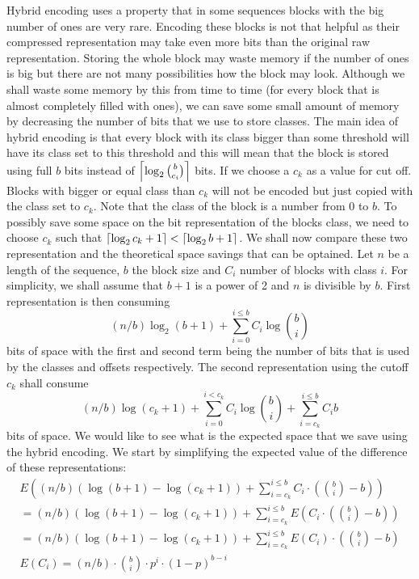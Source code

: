 Hybrid encoding uses a property that in some sequences blocks with the big number
of ones are very rare. Encoding these blocks is not that helpful as their
compressed representation may take even more bits than the original raw
representation. Storing the whole block may waste memory if the number of
ones is big but there are not many possibilities how the block may look.
Although we shall waste some memory by this from time to time (for every
block that is almost completely filled with ones), we can save some small
amount of memory by decreasing the number of bits that we use to store
classes. The main idea of hybrid encoding is that every block with its
class bigger than some threshold will have its class set to this threshold
and this will mean that the block is stored using full $b$ bits instead of
$\left\lceil \log_2{b\choose c_i} \right\rceil$ bits. If we choose a $c_k$ as a value for cut off.
Blocks with bigger or equal class than $c_k$ will not be encoded but just
copied with the class set to $c_k$. Note that the class of the block
is a number from 0 to $b$. To possibly save some space on the bit representation
of the blocks class, we need to choose $c_k$ such that $\left\lceil \log_2 c_k+1 \right\rceil < \left\lceil \log_2 b+1 \right\rceil$.
We shall now compare these two representation and the theoretical space savings that
can be optained. Let $n$ be a length of the sequence, $b$ the block size and $C_i$
number of blocks with class $i$. For simplicity, we shall assume that $b+1$ is a
power of 2 and $n$ is divisible by $b$. First representation is then consuming
$$(n/b)\log_2 (b+1) + \sum_{i=0}^{i\leq b} C_i\log {b\choose i}$$
bits of space with the first and second term being the number of bits that
is used by the classes and offsets respectively. The second representation
using the cutoff $c_k$ shall consume
$$(n/b)\log (c_k+1)+\sum_{i=0}^{i<c_k}C_i\log {b\choose i} + \sum_{i=c_k}^{i\leq b}C_i b$$
bits of space. We would like to see what is the expected space that we save
using the hybrid encoding. We start by simplifying the expected value of the
difference of these representations:
\begin{align*}
E\left((n/b)(\log (b+1) - \log (c_k+1)) + \sum_{i=c_k}^{i\leq b}C_i\cdot \left({b\choose i} - b\right)\right)\\
=(n/b)(\log (b+1) - \log (c_k+1)) + \sum_{i=c_k}^{i\leq b}E\left(C_i\cdot \left({b\choose i} - b\right)\right)\\
=(n/b)(\log (b+1) - \log (c_k+1)) + \sum_{i=c_k}^{i\leq b}E(C_i)\cdot \left({b\choose i} - b\right)\\
E(C_i) = (n/b)\cdot {b\choose i}\cdot p^i\cdot (1-p)^{b-i}
\end{align*}
